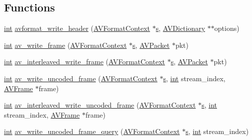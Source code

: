 \subsection*{Functions}
\begin{DoxyCompactItemize}
\item 
\hyperlink{xmltok_8h_a5a0d4a5641ce434f1d23533f2b2e6653}{int} \hyperlink{group__lavf__encoding_ga78d4e734fecb1d2385536e6dd5b7b9f5}{avformat\+\_\+write\+\_\+header} (\hyperlink{struct_a_v_format_context}{A\+V\+Format\+Context} $\ast$\hyperlink{lib_2expat_8h_a755339d27872b13735c2cab829e47157}{s}, \hyperlink{group__lavu__dict_ga1d7cc0833bee918994a600556410315f}{A\+V\+Dictionary} $\ast$$\ast$options)
\item 
\hyperlink{xmltok_8h_a5a0d4a5641ce434f1d23533f2b2e6653}{int} \hyperlink{group__lavf__encoding_gaa85cc1774f18f306cd20a40fc50d0b36}{av\+\_\+write\+\_\+frame} (\hyperlink{struct_a_v_format_context}{A\+V\+Format\+Context} $\ast$\hyperlink{lib_2expat_8h_a755339d27872b13735c2cab829e47157}{s}, \hyperlink{struct_a_v_packet}{A\+V\+Packet} $\ast$pkt)
\item 
\hyperlink{xmltok_8h_a5a0d4a5641ce434f1d23533f2b2e6653}{int} \hyperlink{group__lavf__encoding_ga37352ed2c63493c38219d935e71db6c1}{av\+\_\+interleaved\+\_\+write\+\_\+frame} (\hyperlink{struct_a_v_format_context}{A\+V\+Format\+Context} $\ast$\hyperlink{lib_2expat_8h_a755339d27872b13735c2cab829e47157}{s}, \hyperlink{struct_a_v_packet}{A\+V\+Packet} $\ast$pkt)
\item 
\hyperlink{xmltok_8h_a5a0d4a5641ce434f1d23533f2b2e6653}{int} \hyperlink{group__lavf__encoding_gaab766dccdff1bf323a2fc604e723b441}{av\+\_\+write\+\_\+uncoded\+\_\+frame} (\hyperlink{struct_a_v_format_context}{A\+V\+Format\+Context} $\ast$\hyperlink{lib_2expat_8h_a755339d27872b13735c2cab829e47157}{s}, \hyperlink{xmltok_8h_a5a0d4a5641ce434f1d23533f2b2e6653}{int} stream\+\_\+index, \hyperlink{struct_a_v_frame}{A\+V\+Frame} $\ast$frame)
\item 
\hyperlink{xmltok_8h_a5a0d4a5641ce434f1d23533f2b2e6653}{int} \hyperlink{group__lavf__encoding_gafe9916c601bba6827d6f9271a61260e4}{av\+\_\+interleaved\+\_\+write\+\_\+uncoded\+\_\+frame} (\hyperlink{struct_a_v_format_context}{A\+V\+Format\+Context} $\ast$\hyperlink{lib_2expat_8h_a755339d27872b13735c2cab829e47157}{s}, \hyperlink{xmltok_8h_a5a0d4a5641ce434f1d23533f2b2e6653}{int} stream\+\_\+index, \hyperlink{struct_a_v_frame}{A\+V\+Frame} $\ast$frame)
\item 
\hyperlink{xmltok_8h_a5a0d4a5641ce434f1d23533f2b2e6653}{int} \hyperlink{group__lavf__encoding_ga5f6bebdc8c234a5ad9740de89acb15e6}{av\+\_\+write\+\_\+uncoded\+\_\+frame\+\_\+query} (\hyperlink{struct_a_v_format_context}{A\+V\+Format\+Context} $\ast$\hyperlink{lib_2expat_8h_a755339d27872b13735c2cab829e47157}{s}, \hyperlink{xmltok_8h_a5a0d4a5641ce434f1d23533f2b2e6653}{int} stream\+\_\+index)
$$
\end{DoxyCompactItemize}
